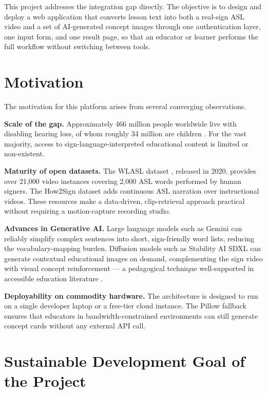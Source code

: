 \documentclass[12pt,a4paper,oneside]{report}
\begin{document}
This project addresses the integration gap directly. The objective is to design and deploy a web application that converts lesson text into both a real-sign ASL video and a set of AI-generated concept images through one authentication layer, one input form, and one result page, so that an educator or learner performs the full workflow without switching between tools.

\section{Motivation}

The motivation for this platform arises from several converging observations.

\textbf{Scale of the gap.} Approximately 466 million people worldwide live with disabling hearing loss, of whom roughly 34 million are children \cite{who2021deafness}. For the vast majority, access to sign-language-interpreted educational content is limited or non-existent.

\textbf{Maturity of open datasets.} The WLASL dataset \cite{li2020wlasl}, released in 2020, provides over 21,000 video instances covering 2,000 ASL words performed by human signers. The How2Sign dataset \cite{duarte2021how2sign} adds continuous ASL narration over instructional videos. These resources make a data-driven, clip-retrieval approach practical without requiring a motion-capture recording studio.

\textbf{Advances in Generative AI.} Large language models such as Gemini \cite{team2023gemini} can reliably simplify complex sentences into short, sign-friendly word lists, reducing the vocabulary-mapping burden. Diffusion models such as Stability AI SDXL \cite{podell2023sdxl} can generate contextual educational images on demand, complementing the sign video with visual concept reinforcement --- a pedagogical technique well-supported in accessible education literature \cite{mayer2009multimedia}.

\textbf{Deployability on commodity hardware.} The architecture is designed to run on a single developer laptop or a free-tier cloud instance. The Pillow fallback ensures that educators in bandwidth-constrained environments can still generate concept cards without any external API call.

\section{Sustainable Development Goal of the Project}
\end{document}
